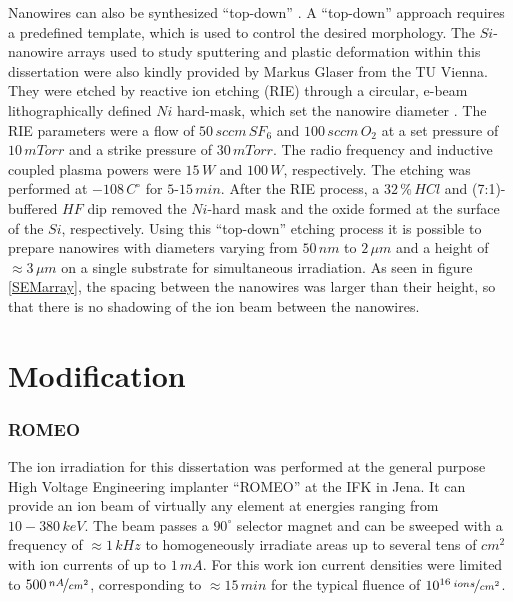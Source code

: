 Nanowires can also be synthesized ``top-down'' \cite{haginoya_nanostructure_1997,hausmann_fabrication_2010}. A ``top-down'' approach requires a predefined template, which is used to control the desired morphology. The $Si$-nanowire arrays used to study sputtering and plastic deformation within this dissertation were also kindly provided by Markus Glaser from the TU Vienna. They were etched by reactive ion etching (RIE) through a circular, e-beam lithographically defined $Ni$ hard-mask, which set the nanowire diameter \cite{johannes_anomalous_2015}. The RIE parameters were a flow of $50\,sccm\,SF_6$ and $100\,sccm\,O_2$ at a set pressure of $10\,mTorr$ and a strike pressure of $30\,mTorr$. The radio frequency and inductive coupled plasma powers were $15\,W$ and $100\,W$, respectively. The etching was performed at $-108\,C^\circ$ for $5$-$15\,min$. After the RIE process, a $32\,\%\,HCl$ and (7:1)-buffered $HF$ dip removed the $Ni$-hard mask and the oxide formed at the surface of the $Si$, respectively. Using this ``top-down'' etching process it is possible to prepare nanowires with diameters varying from $50\,nm$ to $2\,\mu m$ and a height of $\approx 3\,\mu m$ on a single substrate for simultaneous irradiation. As seen in figure \ref{SEMarray}, the spacing between the nanowires was larger than their height, so that there is no shadowing of the ion beam between the nanowires.



\section{Modification}


\subsubsection{ROMEO}


The ion irradiation for this dissertation was performed at the general purpose High Voltage Engineering implanter ``ROMEO'' at the IFK in Jena. It can provide an ion beam of virtually any element at energies ranging from $10-380\,keV$. The beam passes a $90^\circ$ selector magnet and can be sweeped with a frequency of $\approx 1\,kHz$ to homogeneously irradiate areas up to several tens of $cm^2$ with ion currents of up to $1\,mA$. For this work ion current densities were limited to $500\,\nicefrac{nA}{cm^2}$, corresponding to $\approx 15\,min$ for the typical fluence of $10^{16}\,\nicefrac{ions}{cm^2}$.

